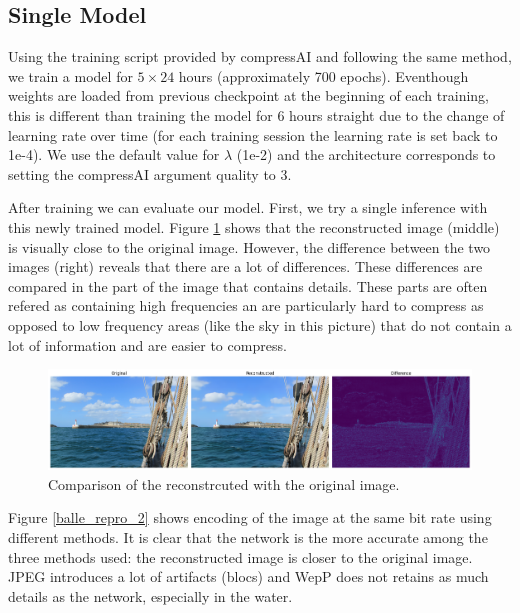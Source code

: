 \subsection{Single Model}
Using the training script provided by compressAI and following the same method, we train a model for \(5 \times 24\) hours (approximately 700 epochs). Eventhough weights are loaded from previous checkpoint at the beginning of each training, this is different than training the model for 6 hours straight due to the change of learning rate over time (for each training session the learning rate is set back to 1e-4). We use the default value for \(\lambda\) (1e-2) and the architecture corresponds to setting the compressAI argument \textsf{quality} to 3.

After training we can evaluate our model. First, we try a single inference with this newly trained model. Figure \ref{balle_repro_1} shows that the reconstructed image (middle) is visually close to the original image. However, the difference between the two images (right) reveals that there are a lot of differences. These differences are compared in the part of the image that contains details. These parts are often refered as containing high frequencies an are particularly hard to compress as opposed to low frequency areas (like the sky in this picture) that do not contain a lot of information and are easier to compress.

\begin{figure}
    \centering
    \includegraphics[width=15cm]{img/balle_repro_1.png}
    \caption{Comparison of the reconstrcuted with the original image.}
    \label{balle_repro_1}
\end{figure}

Figure \ref{balle_repro_2} shows encoding of the image at the same bit rate using different methods. It is clear that the network is the more accurate among the three methods used: the reconstructed image is closer to the original image. JPEG introduces a lot of artifacts (blocs) and WepP does not retains as much details as the network, especially in the water.

